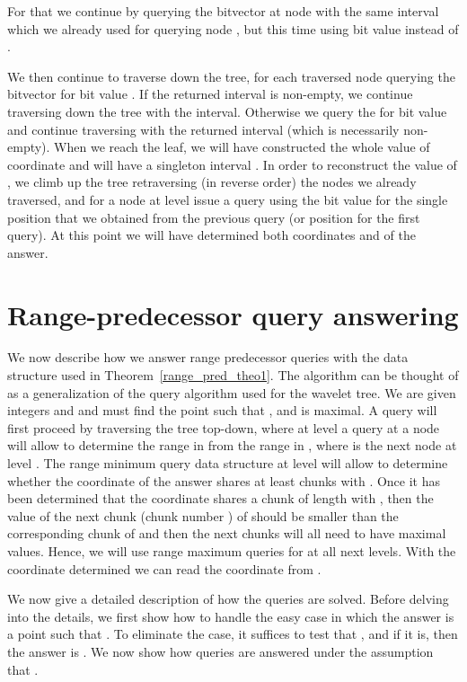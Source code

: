 \documentclass[11pt,runningheads]{llncs}
\begin{document}
{For that we  continue by querying the bitvector at node  with the same interval which we already used for querying node , but this time using bit value  instead of . 

We then continue to traverse down the tree, for each 
traversed node querying the bitvector for bit value . If the returned interval is non-empty, we continue 
traversing down the tree with the interval. Otherwise we query the for bit value  and continue traversing with 
the returned interval (which is necessarily non-empty). When we reach the leaf, we will have constructed 
the whole value of coordinate  and will have a singleton interval . In order to reconstruct the value of , we climb up the tree retraversing (in reverse order) the nodes we already traversed, and for a node at level  issue a  query using the bit value  for the single position that we obtained from the previous  query (or position  for the first  query). 
At this point we will have determined both coordinates  and  of the answer. 


\section{Range-predecessor query answering}
\label{sec:range_succ_queries}
We now describe how we answer range predecessor queries with the data structure
used in Theorem~\ref{range_pred_theo1}. The algorithm can be thought of as a generalization 
of the query algorithm used for the wavelet tree. 
We are given integers  and  and must find the point 
such that ,  and  is maximal. 
A query will first proceed by traversing the tree top-down, 
where at level  a  query at a node  will allow 
to determine the range in  
from the range in , where  is the next node at level . 
The range minimum query data structure at level  will allow to determine 
whether the  coordinate of the answer shares at least  chunks with . 
Once it has been determined that the  coordinate shares a chunk of length 
 with , then the value of the next chunk (chunk number ) 
of  should be smaller than the corresponding chunk of  and then the next chunks 
will all need to have maximal values. Hence, we will use range maximum 
queries for at all next levels. With the  coordinate determined
we can read the  coordinate from . 

We now give a detailed description of how the queries are solved. 
Before delving into the details, we first show how to handle the easy case 
in which the answer is a point  such that . To eliminate 
the case, it suffices to test that , and if it is,
then the answer is . We now show how 
queries are answered under the assumption that . 

}
\end{document}
